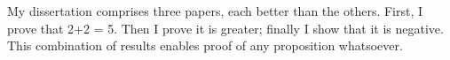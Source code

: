   My dissertation comprises three papers, each better than the others.  First, I prove that 2+2 = 5.  Then I prove it is greater; finally I show that it is negative. This combination of results enables proof of any proposition whatsoever.
